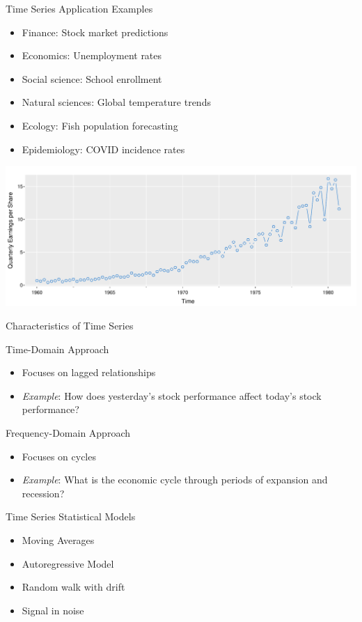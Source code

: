 \documentclass[ignorenonframetext,xcolor=x11names]{beamer}
\begin{document}
\begin{frame}{Time Series Application Examples}
\begin{itemize}
  \item Finance: Stock market predictions
  \item Economics: Unemployment rates
  \item Social science: School enrollment
  \item Natural sciences: Global temperature trends
  \item Ecology: Fish population forecasting
  \item Epidemiology: COVID incidence rates
\end{itemize}
\centering

\includegraphics[width=\textwidth]{figure1.pdf}
\end{frame}


\begin{frame}{Characteristics of Time Series}
\begin{block}{Time-Domain Approach}
\begin{itemize}
  \item Focuses on lagged relationships
  \item \emph{Example}: How does yesterday's stock performance affect today's stock performance?
\end{itemize}
\end{block}

\begin{block}{Frequency-Domain Approach}
\begin{itemize}
  \item Focuses on cycles
  \item \emph{Example}: What is the economic cycle through periods of expansion and recession?
\end{itemize}
\end{block}
\end{frame}

\begin{frame}{Time Series Statistical Models}
\begin{itemize}
   \item Moving Averages
   \item Autoregressive Model
   \item Random walk with drift
   \item Signal in noise
\end{itemize}
\end{frame}
\end{document}
